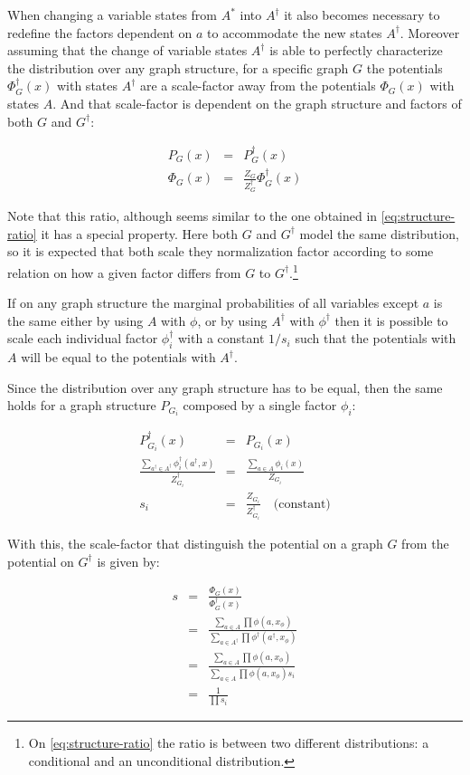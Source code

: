 When changing a variable states from $A^*$ into $A^\dag$ it also becomes necessary to redefine
the factors dependent on $a$ to accommodate the new states $A^\dag$.
Moreover assuming that the change of variable states $A^\dag$ is able to perfectly
characterize the distribution over any graph structure,
for a specific graph $G$ the potentials $\Phi^\dag_G(x)$ with states $A^\dag$ are a
scale\hyp{}factor away from the potentials $\Phi_G(x)$ with states $A$.
And that scale-factor is dependent on the graph structure and factors of both $G$ and $G^\dag$:

\begin{eqnarray}
P_G(x) &=& P^\dag_G(x) \\
\Phi_G(x) &=& \frac{Z_G}{Z^\dag_G} \Phi^\dag_G(x)
\end{eqnarray}

Note that this ratio, although seems similar to the one obtained in
\autoref{eq:structure-ratio} it has a special property. Here both $G$ and
$G^\dag$ model the same distribution, so it is expected that both scale they
normalization factor according to some relation on how a given factor differs
from $G$ to $G^\dag$.\footnote{On \autoref{eq:structure-ratio} the ratio is
between two different distributions: a conditional and an unconditional distribution.}

If on any graph structure the marginal probabilities of all variables except $a$
is the same either by using $A$ with $\phi$, or by using $A^\dag$ with $\phi^\dag$
then it is possible to scale each individual factor $\phi_i^\dag$ with a constant $1/s_i$
such that the potentials with $A$ will be equal to the potentials with $A^\dag$.

Since the distribution over any graph structure has to be
equal, then the same holds for a graph structure $P_{G_i}$ composed by a single
factor $\phi_i$:

\begin{eqnarray*}
P^\dag_{G_i}(x) &=& P_{G_i}(x) \\
\frac{\sum_{a^\dag \in A^\dag}\phi^\dag_i(a^\dag, x)}{Z^\dag_{G_i}}  &=& \frac{\sum_{a \in A}\phi_i(x)}{Z_{G_i}} \\
s_i &=& \frac{Z_{G_i}}{Z^\dag_{G_i}} \quad \text{(constant)}
\end{eqnarray*}

With this, the scale-factor that distinguish the potential on a graph
$G$ from the potential on $G^\dag$ is given by:

\begin{eqnarray*}
s &=& \frac{\Phi_G(x)}{\Phi^\dag_G(x)} \\
  &=& \frac{\sum_{a \in A}\prod \phi(a, x_\phi)}
           {\sum_{a \in A^\dag}\prod \phi^\dag(a^\dag, x_\phi)} \\
  &=& \frac{\sum_{a \in A}\prod \phi(a, x_\phi)}
           {\sum_{a \in A}\prod \phi(a, x_\phi) s_i} \\
  &=& \frac{1}{\prod s_i}
\end{eqnarray*}

